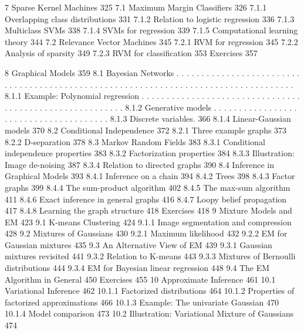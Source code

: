 \documentclass[
  10
]{article}
\begin{document}
7 Sparse Kernel Machines 325 7.1 Maximum Margin Classifiers 326 7.1.1
Overlapping class distributions 331 7.1.2 Relation to logistic
regression 336 7.1.3 Multiclass SVMs 338 7.1.4 SVMs for regression 339
7.1.5 Computational learning theory 344 7.2 Relevance Vector Machines
345 7.2.1 RVM for regression 345 7.2.2 Analysis of sparsity 349 7.2.3
RVM for classification 353 Exercises 357

8 Graphical Models 359 8.1 Bayesian Networks . . . . . . . . . . . . . .
. . . . . . . . . . . . . . . . . . . . . . . . . . . . . . . . . . . .
. . . . . . . . . . . . . . . . . . . . . . . . . . . . . . . . . 8.1.1
Example: Polynomial regression . . . . . . . . . . . . . . . . . . . . .
. . . . . . . . . . . . . . . . . . . . . . . . . . . . . . . . . . .
8.1.2 Generative models . . . . . . . . . . . . . . . . . . . . . . . .
. . . . . . . . . . . . . . 8.1.3 Discrete variables. 366 8.1.4
Linear-Gaussian models 370 8.2 Conditional Independence 372 8.2.1 Three
example graphs 373 8.2.2 D-separation 378 8.3 Markov Random Fields 383
8.3.1 Conditional independence properties 383 8.3.2 Factorization
properties 384 8.3.3 Illustration: Image de-noising 387 8.3.4 Relation
to directed graphs 390 8.4 Inference in Graphical Models 393 8.4.1
Inference on a chain 394 8.4.2 Trees 398 8.4.3 Factor graphs 399 8.4.4
The sum-product algorithm 402 8.4.5 The max-sum algorithm 411 8.4.6
Exact inference in general graphs 416 8.4.7 Loopy belief propagation 417
8.4.8 Learning the graph structure 418 Exercises 418 9 Mixture Models
and EM 423 9.1 K-means Clustering 424 9.1.1 Image segmentation and
compression 428 9.2 Mixtures of Gaussians 430 9.2.1 Maximum likelihood
432 9.2.2 EM for Gaussian mixtures 435 9.3 An Alternative View of EM 439
9.3.1 Gaussian mixtures revisited 441 9.3.2 Relation to K-means 443
9.3.3 Mixtures of Bernoulli distributions 444 9.3.4 EM for Bayesian
linear regression 448 9.4 The EM Algorithm in General 450 Exercises 455
10 Approximate Inference 461 10.1 Variational Inference 462 10.1.1
Factorized distributions 464 10.1.2 Properties of factorized
approximations 466 10.1.3 Example: The univariate Gaussian 470 10.1.4
Model comparison 473 10.2 Illustration: Variational Mixture of Gaussians
474
\end{document}

